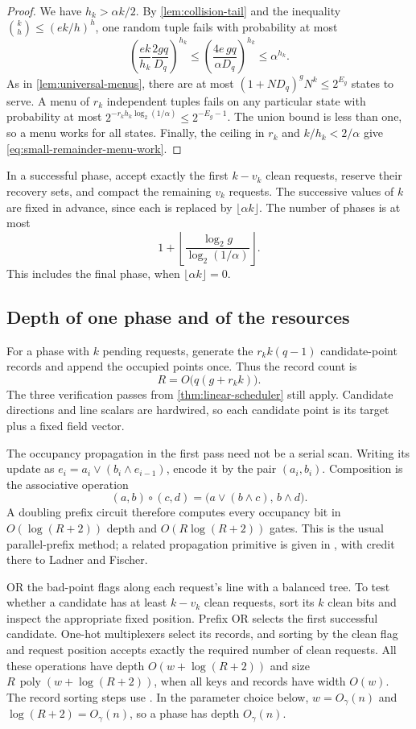 \documentclass[11pt]{article}
\begin{document}
\begin{proof}
We have $h_k>\alpha k/2$.  By \cref{lem:collision-tail} and the inequality
$\binom{k}{h}\le(ek/h)^h$, one random tuple fails with probability at most
\[
  \left(\frac{ek}{h_k}\frac{2gq}{D_q}\right)^{h_k}
  \le
  \left(\frac{4e\,gq}{\alpha D_q}\right)^{h_k}
  \le\alpha^{h_k}.
\]
As in \cref{lem:universal-menus}, there are at most
$(1+ND_q)^gN^k\le2^{E_g}$ states to serve.  A menu of $r_k$ independent
tuples fails on any particular state with probability at most
$2^{-r_kh_k\log_2(1/\alpha)}\le2^{-E_g-1}$.
The union bound is less than one, so a menu works for all states.
Finally, the ceiling in $r_k$ and $k/h_k<2/\alpha$ give
\eqref{eq:small-remainder-menu-work}.
\end{proof}

In a successful phase, accept exactly the first $k-v_k$ clean requests,
reserve their recovery sets, and compact the remaining $v_k$ requests.
The successive values of $k$ are fixed in advance, since each is replaced
by $\lfloor\alpha k\rfloor$.  The number of phases is at most
\[
  1+\left\lfloor\frac{\log_2g}{\log_2(1/\alpha)}\right\rfloor.
\]
This includes the final phase, when $\lfloor\alpha k\rfloor=0$.

\subsection{Depth of one phase and of the resources}

For a phase with $k$ pending requests, generate the $r_k k(q-1)$
candidate-point records and append the occupied points once.  Thus the
record count is
\[
  R=O\bigl(q(g+r_k k)\bigr).
\]
The three verification passes from \cref{thm:linear-scheduler} still
apply.  Candidate directions and line scalars are hardwired, so each
candidate point is its target plus a fixed field vector.

The occupancy propagation in the first pass need not be a serial scan.
Writing its update as $e_i=a_i\vee(b_i\wedge e_{i-1})$, encode it by
the pair $(a_i,b_i)$.  Composition is the associative operation
\[
  (a,b)\circ(c,d)=\bigl(a\vee(b\wedge c),\,b\wedge d\bigr).
\]
A doubling prefix circuit therefore computes every occupancy bit in
$O(\log(R+2))$ depth and $O(R\log(R+2))$ gates.  This is the usual
parallel-prefix method; a related propagation primitive is given in
\cite[Lemma~26]{HolmgrenRothblum2024}, with credit there to Ladner and
Fischer.

OR the bad-point flags along each request's line with a balanced tree.
To test whether a candidate has at least $k-v_k$ clean requests, sort
its $k$ clean bits and inspect the appropriate fixed position.
Prefix OR selects the first successful candidate.  One-hot multiplexers
select its records, and sorting by the clean flag and request position
accepts exactly the required number of clean requests.  All these
operations have depth $O(w+\log(R+2))$ and size
$R\,\operatorname{poly}(w+\log(R+2))$, when all keys and records have
width $O(w)$.  The record sorting steps use
\cite[Lemma~6]{HolmgrenRothblum2024}.  In the parameter choice below,
$w=O_\gamma(n)$ and $\log(R+2)=O_\gamma(n)$, so a phase has depth
$O_\gamma(n)$.
\end{document}
